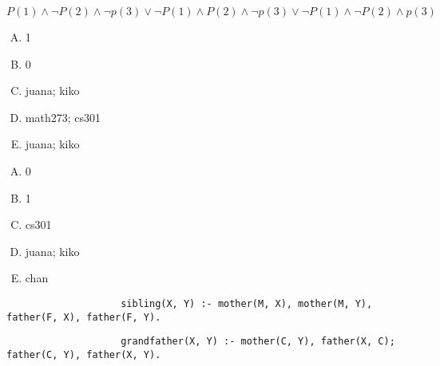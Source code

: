 {{        %
        \begin{practices}
            $P(1) \wedge \neg P(2) \wedge \neg p(3) \vee \neg P(1) \wedge P(2) \wedge \neg p(3) \vee \neg P(1) \wedge \neg P(2) \wedge p(3)$
        \end{practices}

        \begin{practices}
            \begin{enumerate}[A.]
                \item 1
                \item 0
                \item juana; kiko
                \item math273; cs301
                \item juana; kiko
            \end{enumerate}
        \end{practices}

        \begin{practices}
            \begin{enumerate}[A.]
                \item 0
                \item 1
                \item cs301
                \item juana; kiko
                \item chan
            \end{enumerate}
        \end{practices}

        \begin{practices}
            \begin{codelist}
                \begin{lstlisting}
                    sibling(X, Y) :- mother(M, X), mother(M, Y), father(F, X), father(F, Y).
                \end{lstlisting}
            \end{codelist}
        \end{practices}

        \begin{practices}
            \begin{codelist}
                \begin{lstlisting}
                    grandfather(X, Y) :- mother(C, Y), father(X, C); father(C, Y), father(X, Y).
                \end{lstlisting}
            \end{codelist}
        \end{practices}

}}
